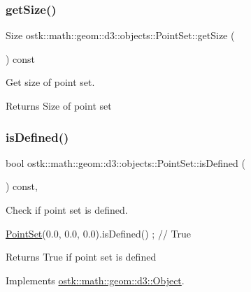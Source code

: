 \subsubsection{\texorpdfstring{get\+Size()}{getSize()}}
{\footnotesize\ttfamily Size ostk\+::math\+::geom\+::d3\+::objects\+::\+Point\+Set\+::get\+Size (\begin{DoxyParamCaption}{ }\end{DoxyParamCaption}) const}



Get size of point set. 

\begin{DoxyReturn}{Returns}
Size of point set 
\end{DoxyReturn}
\mbox{\label{classostk_1_1math_1_1geom_1_1d3_1_1objects_1_1_point_set_a2457cedb218c01b5f0b16a280ccceb95}} 
\subsubsection{\texorpdfstring{is\+Defined()}{isDefined()}}
{\footnotesize\ttfamily bool ostk\+::math\+::geom\+::d3\+::objects\+::\+Point\+Set\+::is\+Defined (\begin{DoxyParamCaption}{ }\end{DoxyParamCaption}) const\hspace{0.3cm}{\ttfamily [override]}, {\ttfamily [virtual]}}



Check if point set is defined. 


\begin{DoxyCode}
\hyperlink{classostk_1_1math_1_1geom_1_1d3_1_1objects_1_1_point_set_a285835d8348a60ceaf227bd76e3a5546}{PointSet}(0.0, 0.0, 0.0).isDefined() ; \textcolor{comment}{// True}
\end{DoxyCode}


\begin{DoxyReturn}{Returns}
True if point set is defined 
\end{DoxyReturn}


Implements \hyperlink{classostk_1_1math_1_1geom_1_1d3_1_1_object_a271a1964cd208be85ce9a0a429395ad8}{ostk\+::math\+::geom\+::d3\+::\+Object}.

